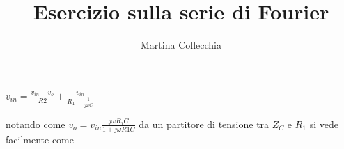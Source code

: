 \documentclass{article}
\title{Esercizio sulla serie di Fourier}
\author{Martina Collecchia}
\begin{document}
$v_{in} = \frac{v_{in} - v_o}{R2} + \frac{v_{in}}{R_1+\frac{1}{j\omega C}} $


notando come 
$ v_o = v_{in} \frac{j\omega R_1 C}{1 + j\omega R1 C} $ da un partitore di tensione tra $Z_C$ e $R_1$ si vede facilmente come 
\end{document}
